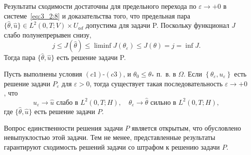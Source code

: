 Результаты сходимости достаточны для предельного
перехода по $\varepsilon \rightarrow+0$ в системе~\eqref{eq:3_2:8}
и доказательства того, что предельная пара
$\{\widehat{\theta}, \widehat{u}\} \in L ^{2}(0, T ; V) \times U_{a d}$
допустима для задачи P\@.
Поскольку функционал $J$ слабо полунепрерывен снизу,
\[
    j \leq J(\widehat{\theta})
    \leq \liminf J \left(\theta_{\varepsilon}\right)
    \leq J(\theta)=j=\inf J.
\]
Тогда пара $\{\widehat{\theta}, \widehat{u}\}$ есть решение задачи P\@.

\begin{theorem}
    \label{th:3_2:3}
    Пусть выполнены условия $(c1)$-$(c3)$, и $\theta_{0} \leq \theta_{*}$ п.\ в. в $\Omega$.
    Если $\left\{\theta_{\varepsilon}, u_{\varepsilon}\right\}$ есть решение задачи
    $P_{\varepsilon}$ для $\varepsilon>0$, тогда существует
    такая последовательность $\varepsilon \rightarrow+0$, что
    \[
            u_{\varepsilon} \rightarrow \widehat{u} \text { слабо в } L^{2}(0, T ; H), \quad
            \theta_{\varepsilon} \rightarrow \widehat{\theta} \text { сильно в } L^{2}(0, T ; H),
    \]
    где $\{\widehat{\theta}, \widehat{u}\}$ есть решение задачи $P$\@.
\end{theorem}
\begin{remark}
    Вопрос единственности решения задачи $P$ является открытым, что обусловлено невыпуклостью этой задачи.
    Тем не менее, представленные результаты гарантируют сходимость решений задачи со штрафом
    к решению задачи $P$.
\end{remark}
